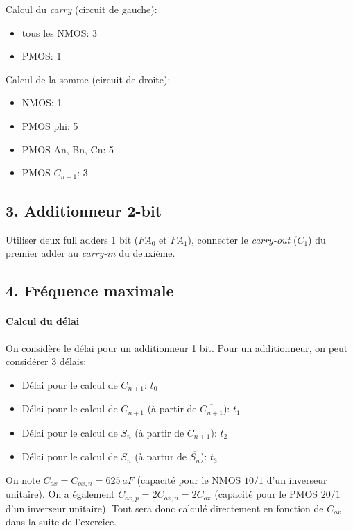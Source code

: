 \documentclass[frenchb,DIV=14]{scrartcl}
\begin{document}
Calcul du \emph{carry} (circuit de gauche):
\begin{itemize}
    \item tous les NMOS: 3
    \item PMOS: 1
\end{itemize}

Calcul de la somme (circuit de droite):
\begin{itemize}
    \item NMOS: 1
    \item PMOS phi: 5
    \item PMOS An, Bn, Cn: 5
    \item PMOS $C_{n+1}$: 3
\end{itemize}

\subsection*{3. Additionneur 2-bit}

Utiliser deux full adders 1 bit ($FA_0$ et $FA_1$), connecter le 
\emph{carry-out} ($C_1$) du premier adder au \emph{carry-in} du deuxième. 

\subsection*{4. Fréquence maximale}

\paragraph{Calcul du délai}

On considère le délai pour un additionneur 1 bit.
Pour un additionneur, on peut considérer 3 délais:
\begin{itemize}
    \item Délai pour le calcul de $\overline{C_{n+1}}$: $t_0$
    \item Délai pour le calcul de $C_{n+1}$ (à partir de $\overline{C_{n+1}}$): $t_1$
    \item Délai pour le calcul de $\overline{S_n}$ (à partir de $\overline{C_{n+1}}$): $t_2$
    \item Délai pour le calcul de $S_n$ (à partur de $\overline{S_n}$): $t_3$
\end{itemize}

On note $C_{ox} = C_{ox,n} = \SI{625}{aF}$ (capacité pour le NMOS $10/1$ 
d'un inverseur unitaire). On a également $C_{ox,p} = 2C_{ox,n} = 2C_{ox}$ (capacité
pour le PMOS $20/1$ d'un inverseur unitaire). Tout sera
donc calculé directement en fonction de $C_{ox}$ dans la suite de l'exercice.\\
\end{document}
